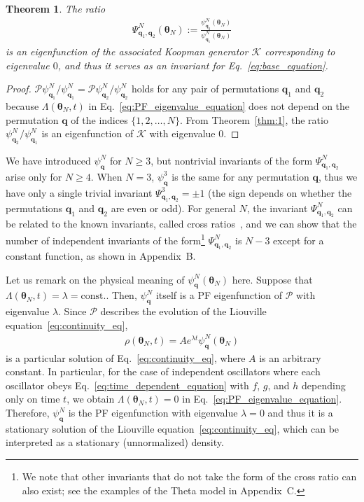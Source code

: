 \documentclass[
amsmath,amssymb,
]{revtex4-2}
\newtheorem{theorem}{Theorem}
\begin{document}
\begin{theorem}
The ratio 
\begin{align}
    \Psi^N_{\bm{q}_1, \bm{q}_2}(\bm{\theta}_N) := \frac{\psi^N_{\bm{q}_2}(\bm{\theta}_N)}{\psi^N_{\bm{q}_1}(\bm{\theta}_N)}
\end{align}
is an eigenfunction of the associated Koopman generator $\mathcal{K}$ corresponding to eigenvalue $0$, 
and thus it serves as an invariant for Eq.~\eqref{eq:base_equation}.
\end{theorem}
%
\begin{proof}
$\mathcal{P} \psi_{\bm{q}_1}^N / \psi_{\bm{q}_1}^N = \mathcal{P} \psi_{\bm{q}_2}^N / \psi_{\bm{q}_2}^N$ holds for any pair of permutations $\bm{q}_1$ and $\bm{q}_2$ because $\Lambda(\bm{\theta}_N, t)$ in Eq.~\eqref{eq:PF_eigenvalue_equation} does not depend on the permutation 
$\bm{q}$ of the indices $\{1, 2, \ldots, N\}$. From Theorem~\ref{thm:1}, the ratio $\psi^N_{\bm{q}_2} / \psi^N_{\bm{q}_1}$ is an eigenfunction of $\mathcal{K}$ with eigenvalue $0$.
\end{proof}

\par

We have introduced $\psi^N_{\bm{q}}$ for $N\geq 3$, but nontrivial invariants of the form $\Psi^N_{\bm{q}_1,\bm{q}_2}$ arise only for $N\geq 4$. When $N=3$, $\psi^3_{\bm{q}}$ is the same for any permutation $\bm{q}$, thus we have only a single trivial invariant  $\Psi^{3}_{\bm{q}_1,\bm{q}_2} = \pm1$ (the sign depends on whether the permutations $\bm{q}_1$ and $\bm{q}_2$ are even or odd).
%
For general $N$, the invariant $\Psi^N_{\bm{q}_1, \bm{q}_2}$ can be related to the known invariants, called cross ratios~\cite{Marvel2009identical}, and we can show that the number of independent invariants of the form\footnote{We note that other invariants that do not take the form of the cross ratio can also exist; see the examples of the Theta model in Appendix~C.} $\Psi^N_{\bm{q}_1, \bm{q}_2}$ is $N-3$ except for a constant function, as shown in Appendix~B.
%

Let us remark on the physical meaning of $\psi^N_{\bm{q}}(\bm{\theta}_N)$ here.
%
Suppose that $\Lambda(\bm{\theta}_N, t) = \lambda = \text{const.}$. Then, $\psi^N_{\bm{q}}$ itself is a PF eigenfunction of $\mathcal{P}$ with eigenvalue $\lambda$.
%
Since $\mathcal{P}$ describes the evolution of the Liouville equation~\eqref{eq:continuity_eq},
%
\begin{align}
    \label{eq:particular solution}
    \rho(\bm{\theta}_N, t) = A e^{\lambda t} \psi^N_{\bm{q}}(\bm{\theta}_N)
\end{align}
%
is a particular solution of Eq.~\eqref{eq:continuity_eq}, where $A$ is an arbitrary constant.
%
In particular, for the case of independent oscillators where each oscillator obeys Eq.~\eqref{eq:time_dependent_equation} with $f$, $g$, and $h$ depending only on time $t$, we obtain $\Lambda(\bm{\theta}_N, t) = 0$ in Eq.~\eqref{eq:PF_eigenvalue_equation}. 
%
Therefore, $\psi^N_{\bm{q}}$ is the PF eigenfunction with eigenvalue $\lambda=0$ and thus it is a stationary solution of the Liouville equation~\eqref{eq:continuity_eq}, which can be interpreted as a stationary (unnormalized) density.
%
\end{document}
